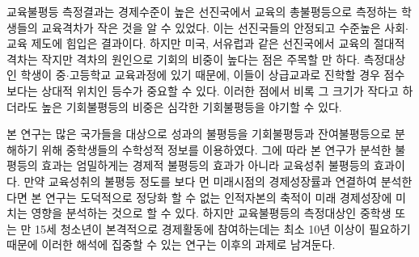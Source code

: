 교육불평등 측정결과는 경제수준이 높은 선진국에서 교육의 총불평등으로 측정하는 학생들의 교육격차가 작은 것을 알 수 있었다.
이는 선진국들의 안정되고 수준높은 사회$\cdot$교육 제도에 힘입은 결과이다.
 하지만 미국, 서유럽과 같은 선진국에서 교육의 절대적 격차는 작지만 격차의 원인으로 기회의 비중이 높다는 점은 주목할 만 하다.
 측정대상인 학생이 중$\cdot$고등학교 교육과정에 있기 때문에, 이들이 상급교과로 진학할 경우 점수보다는 상대적 위치인 등수가 중요할 수 있다.
 이러한 점에서 비록 그 크기가 작다고 하더라도 높은 기회불평등의 비중은 심각한 기회불평등을 야기할 수 있다.

\label{ans5-2}
본 연구는 많은 국가들을 대상으로 성과의 불평등을 기회불평등과 잔여불평등으로 분해하기 위해 중학생들의 수학성적 정보를 이용하였다.
그에 따라 본 연구가 분석한 불평등의 효과는 엄밀하게는 경제적 불평등의 효과가 아니라 교육성취 불평등의 효과이다.
만약 교육성취의 불평등 정도를 보다 먼 미래시점의 경제성장률과 연결하여 분석한다면 본 연구는 도덕적으로 정당화 할 수 없는 인적자본의 축적이 미래 경제성장에 미치는 영향을 분석하는 것으로 할 수 있다. 
하지만 교육불평등의 측정대상인 중학생 또는 만 15세 청소년이 본격적으로 경제활동에 참여하는데는 최소 10년 이상이 필요하기 때문에 이러한 해석에 집중할 수 있는 연구는 이후의 과제로 남겨둔다.